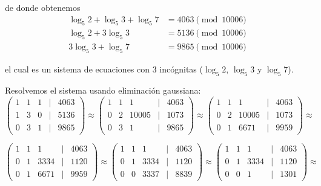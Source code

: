 \documentclass[letterpaper,11pt]{article}
\begin{document}
\begin{enumerate}
\begin{enumerate}
        de donde obtenemos
        \begin{align*}
            \log_{5} 2 + \log_{5} 3 + \log_{5} 7 &= 4063 \pmod{10006} \\
            \log_{5} 2 + 3 \log_{5} 3 &= 5136 \pmod{10006} \\
            3 \log_{5} 3 + \log_{5} 7 &= 9865\pmod{10006} 
        \end{align*}
        
        el cual es un sistema de ecuaciones con $3$ incógnitas ($\log_{5} 2$,
        $\log_{5} 3$ y $\log_{5} 7$).
        
        Resolvemos el sistema usando eliminación gaussiana:
        \begin{equation*}
            \begin{pmatrix}
            1 & 1 & 1 & | & 4063 \\
            1 & 3 & 0 & | & 5136 \\
            0 & 3 & 1 & | & 9865
            \end{pmatrix}
            \approx
            \begin{pmatrix}
            1 & 1 & 1 & | & 4063\\
            0 & 2 & 10005 & | & 1073 \\
            0 & 3 & 1 & | & 9865
            \end{pmatrix}
            \approx
            \begin{pmatrix}
            1 & 1 & 1 & | & 4063\\
            0 & 2 & 10005 & | & 1073\\
            0 & 1 & 6671 & | & 9959
            \end{pmatrix}
            \approx
        \end{equation*} 
        
        \begin{equation*}
            \begin{pmatrix}
            1 & 1 & 1 & | & 4063\\
            0 & 1 & 3334 & | & 1120\\
            0 & 1 & 6671 & | & 9959
            \end{pmatrix}
            \approx
            \begin{pmatrix}
            1 & 1 & 1 & | & 4063\\
            0 & 1 & 3334 & | & 1120\\
            0 & 0 & 3337 & | & 8839
            \end{pmatrix}
            \approx
            \begin{pmatrix}
            1 & 1 & 1 & | & 4063\\
            0 & 1 & 3334 & | & 1120\\
            0 & 0 & 1 & | & 1301
            \end{pmatrix}
            \approx
        \end{equation*}
        

\end{enumerate}
\end{enumerate}
\end{document}
